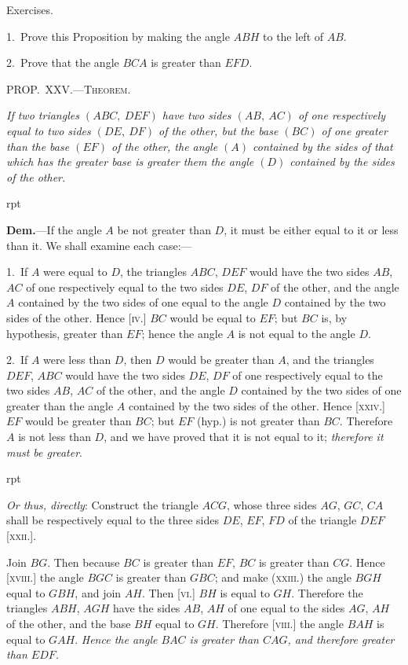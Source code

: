 \documentclass[oneside]{book}
\newcounter{wrapwidth}
\newcommand\mypropl[2]{
\bigskip\Needspace*{4\baselineskip}\begin{center}\textsc{#1}\end{center}
\hspace{\parindent}\emph{#2}\par\medskip
}
\newcommand\exhead[1]{
\Needspace*{5\baselineskip}\begin{center}
\textsf{#1}
\end{center}
}
\newcommand\imgflow[3]{
\setcounter{wrapwidth}{#1}

\begin{wrapfigure}[#2]{r}{\value{wrapwidth}pt}
\begin{center}
\vspace{-0.3in}

\end{center}
\end{wrapfigure}
}
\begin{document}
\exhead{Exercises.}

\begin{footnotesize}
1.~Prove this Proposition by making the angle $ABH$ to the
left of $AB$.

2.~Prove that the angle $BCA$ is greater than $EFD$.
\par\end{footnotesize}



\mypropl{PROP\@.~XXV\@.---Theorem.}{If two triangles $(ABC,\ DEF)$ have two sides $(AB,\ AC)$
of one respectively equal to two sides $(DE,\ DF)$ of the
other, but the base $(BC)$ of one greater than the base
$(EF)$ of the other, the angle $(A)$ contained by the sides of
that which has the greater base is greater them the angle
$(D)$ contained by the sides of the other.}


\imgflow{190}{10}{f042}

\textbf{Dem.}---If the angle $A$ be not greater than $D$, it must
be either equal to
it or less than it.
We shall examine
each case:---

1.~If $A$ were
equal to $D$, the triangles
$ABC$, $DEF$
would have the two
sides $AB$, $AC$ of one
respectively equal
to the two sides $DE$, $DF$ of the other, and the angle $A$
contained by the two sides of one equal to the angle $D$
contained by the two sides of the other. Hence [\textsc{iv}.]
$BC$ would be equal to $EF$; but $BC$ is, by hypothesis,
greater than $EF$; hence the angle $A$ is not equal to
the angle $D$.

2.~If $A$ were less than $D$, then $D$ would be greater
than $A$, and the triangles $DEF$, $ABC$ would have the two
sides $DE$, $DF$ of one respectively equal to the two sides
$AB$, $AC$ of the other, and the angle $D$ contained by the
two sides of one greater than the angle $A$ contained by
the two sides of the other. Hence [\textsc{xxiv}.] $EF$ would be
greater than $BC$; but $EF$ (hyp.) is not greater than $BC$.
Therefore $A$ is not less than $D$, and we have proved
that it is not equal to it; \emph{therefore it must be greater}.


\imgflow{190}{10}{f043}

\emph{Or thus, directly}: Construct the triangle $ACG$, whose
three sides $AG$, $GC$, $CA$ shall be respectively equal to
the three sides $DE$, $EF$, $FD$ of the triangle $DEF$ [\textsc{xxii}.].

Join $BG$. Then because $BC$ is greater than $EF$, $BC$ is
greater than $CG$. Hence [\textsc{xviii}.] the angle $BGC$ is
greater than $GBC$;
and make (\textsc{xxiii}.)
the angle $BGH$ equal
to $GBH$, and join
$AH$. Then [\textsc{vi}.] $BH$
is equal to $GH$.
Therefore the triangles
$ABH$, $AGH$
have the sides $AB$,
$AH$ of one equal to
the sides $AG$, $AH$ of the other, and the base $BH$ equal to
$GH$. Therefore [\textsc{viii}.] the angle $BAH$ is equal to $GAH$.
\emph{Hence the angle $BAC$ is greater than $CAG$, and therefore
greater than $EDF$.}
\end{document}
